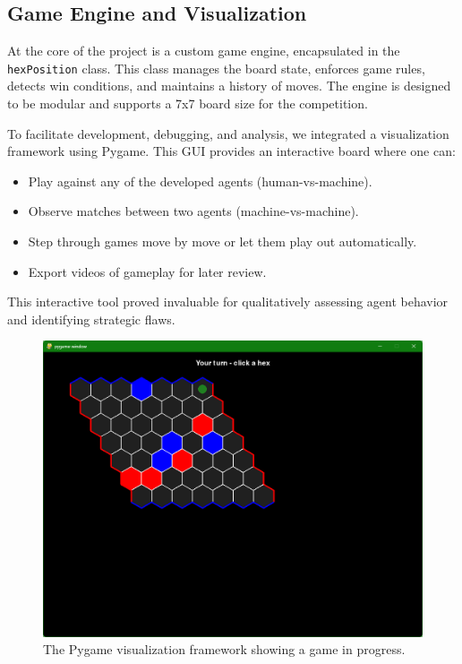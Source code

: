 \documentclass[conference]{IEEEtran}
\begin{document}
\subsection{Game Engine and Visualization}
At the core of the project is a custom game engine, encapsulated in the \texttt{hexPosition} class. This class manages the board state, enforces game rules, detects win conditions, and maintains a history of moves. The engine is designed to be modular and supports a 7x7 board size for the competition.

To facilitate development, debugging, and analysis, we integrated a visualization framework using Pygame. This GUI provides an interactive board where one can:
\begin{itemize}
    \item Play against any of the developed agents (human-vs-machine).
    \item Observe matches between two agents (machine-vs-machine).
    \item Step through games move by move or let them play out automatically.
    \item Export videos of gameplay for later review.
\end{itemize}
This interactive tool proved invaluable for qualitatively assessing agent behavior and identifying strategic flaws.

\begin{figure}[htbp]
\centerline{\includegraphics[width=0.8\columnwidth]{hex-pygame.png}}
\caption{The Pygame visualization framework showing a game in progress.}
\label{fig:gui}
\end{figure}
\end{document}
